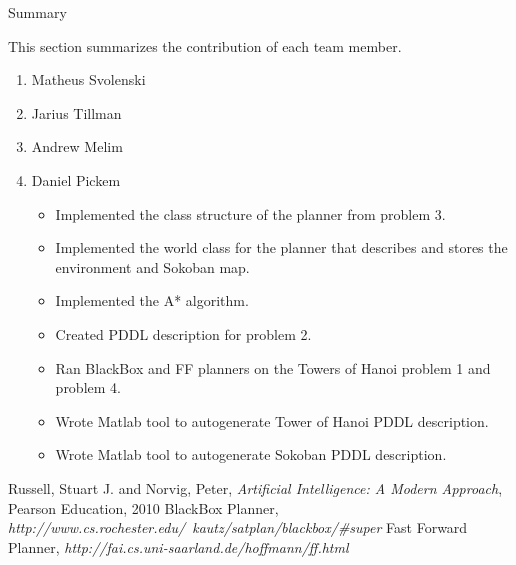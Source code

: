 \documentclass[12pt]{article}
\begin{document}
\newpage
\begin{center}
\Huge{Summary} 
\end{center}
This section summarizes the contribution of each team member. 

\begin{enumerate}
  \item Matheus Svolenski
  \item Jarius Tillman
  \item Andrew Melim
  \item Daniel Pickem
    \begin{itemize}
     \item Implemented the class structure of the planner from problem 3.
     \item Implemented the world class for the planner that describes and stores the environment and Sokoban map.
     \item Implemented the A* algorithm.
     \item Created PDDL description for problem 2.
     \item Ran BlackBox and FF planners on the Towers of Hanoi problem 1 and problem 4.
     \item Wrote Matlab tool to autogenerate Tower of Hanoi PDDL description.
     \item Wrote Matlab tool to autogenerate Sokoban PDDL description.
    \end{itemize}
\end{enumerate}

\begin{thebibliography}{50}
   Russell, Stuart J. and Norvig, Peter, \textsl{Artificial Intelligence: A Modern Approach}, Pearson Education, 2010
   BlackBox Planner, \textsl{http://www.cs.rochester.edu/~kautz/satplan/blackbox/\#super}
   Fast Forward Planner, \textsl{http://fai.cs.uni-saarland.de/hoffmann/ff.html}
\end{thebibliography}
\end{document}
